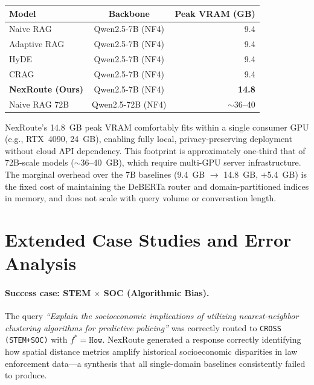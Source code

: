 \documentclass[a4paper,fleql]{cas-sc}
\begin{document}
\vspace{6pt plus 4pt minus 3pt}
\begin{center}
\begingroup
{}
\label{tab:efficiency_app}
\renewcommand{\arraystretch}{1.3}
\begin{tabular}{lcr}
\toprule
\textbf{Model} & \textbf{Backbone} & \textbf{Peak VRAM (GB)} \\
\midrule
Naive RAG        & Qwen2.5-7B (NF4) &  9.4 \\
Adaptive RAG     & Qwen2.5-7B (NF4) &  9.4 \\
HyDE             & Qwen2.5-7B (NF4) &  9.4 \\
CRAG             & Qwen2.5-7B (NF4) &  9.4 \\
\midrule
\textbf{NexRoute (Ours)} & Qwen2.5-7B (NF4) & \textbf{14.8} \\
\midrule
Naive RAG 72B    & Qwen2.5-72B (NF4) & $\sim$36--40 \\
\bottomrule
\end{tabular}
\endgroup
\end{center}
\vspace{6pt plus 4pt minus 3pt}

NexRoute's 14.8~GB peak VRAM comfortably fits within a single consumer
GPU (e.g., RTX~4090, 24~GB), enabling fully local, privacy-preserving
deployment without cloud API dependency. This footprint is approximately
one-third that of 72B-scale models ($\sim$36--40~GB), which require
multi-GPU server infrastructure. The marginal overhead over the 7B
baselines (9.4~GB $\to$ 14.8~GB, $+$5.4~GB) is the fixed cost of
maintaining the DeBERTa router and domain-partitioned indices in memory,
and does not scale with query volume or conversation length.
\section{Extended Case Studies and Error Analysis}
\label{app:casestudies}

\paragraph{Success case: STEM $\times$ SOC (Algorithmic Bias).}
The query \textit{``Explain the socioeconomic implications of utilizing
nearest-neighbor clustering algorithms for predictive policing''} was
correctly routed to \texttt{CROSS (STEM+SOC)} with $f^* = \texttt{How}$.
NexRoute generated a response correctly identifying how spatial distance
metrics amplify historical socioeconomic disparities in law enforcement
data---a synthesis that all single-domain baselines consistently failed
to produce.
\end{document}

